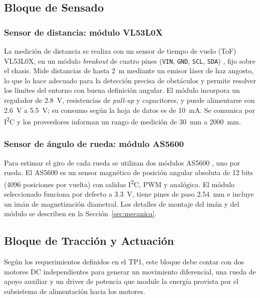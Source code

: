 \subsection{Bloque de Sensado}
\subsubsection{Sensor de distancia: módulo VL53L0X}
La medición de distancia se realiza con un sensor de tiempo de vuelo (ToF) VL53L0X, en un módulo \emph{breakout} de cuatro pines (\texttt{VIN}, \texttt{GND}, \texttt{SCL}, \texttt{SDA}) \cite{vl53mod}, fijo sobre el chasis. Mide distancias de hasta \SI{2}{m} mediante un emisor láser de haz angosto, lo que lo hace adecuado para la detección precisa de obstáculos y permite resolver los límites del entorno con buena definición angular. El módulo incorpora un regulador de \SI{2,8}{V}, resistencias de \emph{pull-up} y capacitores, y puede alimentarse con \SI{2,6}{V} a \SI{5,5}{V}; su consumo según la hoja de datos es de \SI{10}{mA}. Se comunica por I\textsuperscript{2}C y los proveedores informan un rango de medición de \SI{30}{mm} a \SI{2000}{mm}.

\subsubsection{Sensor de ángulo de rueda: módulo AS5600}
Para estimar el giro de cada rueda se utilizan dos módulos AS5600 \cite{as5600mod}, uno por rueda. El AS5600 es un sensor magnético de posición angular absoluta de 12 bits (4096 posiciones por vuelta) con salidas I\textsuperscript{2}C, PWM y analógica. El módulo seleccionado funciona por defecto a \SI{3,3}{V}, tiene pines de paso \SI{2,54}{mm} e incluye un imán de magnetización diametral. Los detalles de montaje del imán y del módulo se describen en la Sección~\ref{sec:mecanica}.


\subsection{Bloque de Tracción y Actuación}
Según los requerimientos definidos en el TP1, este bloque debe contar con dos motores DC independientes para generar un movimiento diferencial, una rueda de apoyo auxiliar y un driver de potencia que module la energía provista por el subsistema de alimentación hacia los motores.

